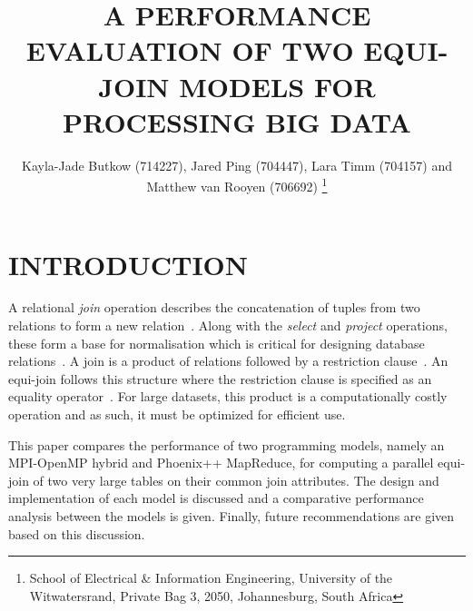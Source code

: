 \documentclass[12pt,twocolumn]{witseiepaper}
\begin{document}

\title{A PERFORMANCE EVALUATION OF TWO EQUI-JOIN MODELS FOR PROCESSING BIG DATA}

\author{Kayla-Jade Butkow (714227), Jared Ping (704447), Lara Timm (704157) and Matthew van Rooyen (706692)
	\thanks{School of Electrical \& Information Engineering, University of the
		Witwatersrand, Private Bag 3, 2050, Johannesburg, South Africa}
}

%


\maketitle
\thispagestyle{empty}
\pagestyle{plain}
\setcounter{page}{1}

\section{INTRODUCTION}

A relational \textit{join} operation describes the concatenation of tuples from two relations to form a new relation~\cite{stanczyk2001theory}. Along with the \textit{select} and \textit{project} operations, these form a base for normalisation which is critical for designing database relations~\cite{stanczyk2001theory}. A join is a product of relations followed by a restriction clause~\cite{stanczyk2001theory}. An equi-join follows this structure where the restriction clause is specified as an equality operator~\cite{stanczyk2001theory}. For large datasets, this product is a computationally costly operation and as such, it must be optimized for efficient use.

This paper compares the performance of two programming models, namely an MPI-OpenMP hybrid and Phoenix++ MapReduce, for computing a parallel equi-join of two very large tables on their common join attributes. The design and implementation of each model is discussed and a comparative performance analysis between the models is given. Finally, future recommendations are given based on this discussion.
\end{document}
